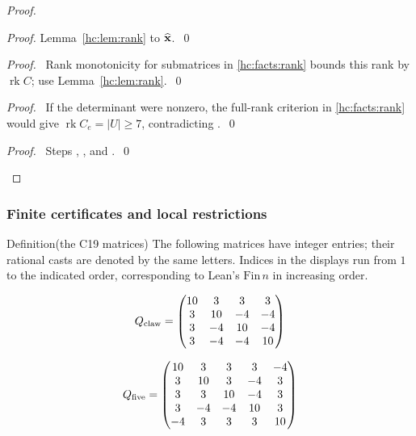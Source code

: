 \begin{mergedproofsection}
\begin{proof}
\begin{proof}
  Lemma~\ref{hc:lem:rank} to $\widehat{{\mathbf x}}$.~\qed\end{proof}
 \begin{proof}\pf\ Rank monotonicity for submatrices in
  \ref{hc:facts:rank} bounds this rank by $\operatorname{rk}C$;
  use Lemma~\ref{hc:lem:rank}.~\qed\end{proof}
 \begin{proof}\pf\ If the determinant were nonzero, the full-rank
  criterion in \ref{hc:facts:rank} would give
  $\operatorname{rk}C_e=|U|\ge7$, contradicting .~\qed\end{proof}
 \qedstep
 \begin{proof}\pf\ Steps , ,
  and .~\qed\end{proof}
\end{proof}

\subsubsection{Finite certificates and local restrictions}

\begin{namedresult}{Definition}{(the C19 matrices)}\label{hc:def:certificates}
 \uses{}
 The following matrices have integer entries; their rational casts
 are denoted by the same letters. Indices in the displays run from
 $1$ to the indicated order, corresponding to Lean's
 $\mathrm{Fin}\,n$ in increasing order.

\[
 Q_{\rm claw}=
 \begin{pmatrix}
 10&3&3&3\\3&10&-4&-4\\3&-4&10&-4\\3&-4&-4&10
 \end{pmatrix}
\]

\[
 Q_{\rm five}=
 \begin{pmatrix}
 10&3&3&3&-4\\3&10&3&-4&3\\3&3&10&-4&3\\
 3&-4&-4&10&3\\-4&3&3&3&10
 \end{pmatrix}
\]


\end{namedresult}
\end{mergedproofsection}
